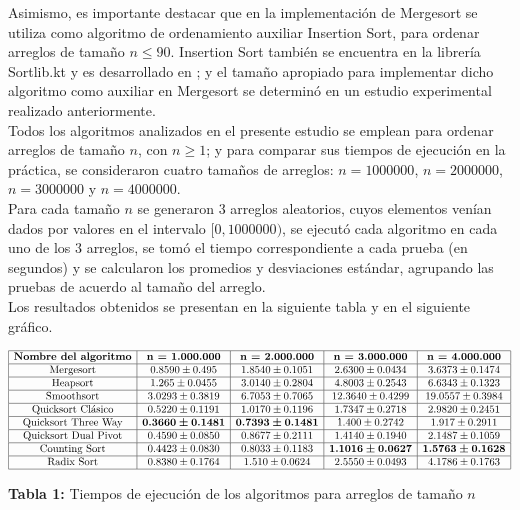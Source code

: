 \documentclass{article}
\begin{document}
	Asimismo, es importante destacar que en la implementaci\'on de Mergesort se utiliza como algoritmo de ordenamiento auxiliar Insertion Sort, para ordenar arreglos de tamaño $n \leq 90$. Insertion Sort tambi\'en se encuentra en la librer\'ia Sortlib.kt y es desarrollado en \cite{6}; y el tamaño apropiado para implementar dicho algoritmo como auxiliar en Mergesort se determin\'o en un estudio experimental realizado anteriormente.\\
	
	Todos los algoritmos analizados en el presente estudio se emplean para ordenar arreglos de tamaño $n$, con $n \geq 1$; y para comparar sus tiempos de ejecuci\'on en la pr\'actica, se consideraron cuatro tamaños de arreglos: $n = 1000000$, $n = 2000000$, $n = 3000000$ y $n = 4000000$.\\
	
	Para cada tamaño $n$ se generaron $3$ arreglos aleatorios, cuyos elementos ven\'ian dados por valores en el intervalo $[0,1000000)$, se ejecut\'o cada algoritmo en cada uno de los $3$ arreglos, se tom\'o el tiempo correspondiente a cada prueba (en segundos) y se calcularon los promedios y desviaciones est\'andar, agrupando las pruebas de acuerdo al tamaño del arreglo.\\
	
	Los resultados obtenidos se presentan en la siguiente tabla y en el siguiente gr\'afico. 

	$$\begin{array}{|c|c|c|c|c|}
		\hline
		\textbf{Nombre del algoritmo} & \textbf{n = 1.000.000} & \textbf{n = 2.000.000} & \textbf{n = 3.000.000} & \textbf{n = 4.000.000}\\
		\hline
		\text{Mergesort} & 0.8590 \pm 0.495 & 1.8540 \pm 0.1051 & 2.6300\pm 0.0434 & 3.6373 \pm 0.1474 \\
		\hline
		\text{Heapsort} & 1.265 \pm 0.0455 & 3.0140 \pm 0.2804 & 4.8003 \pm 0.2543 & 6.6343 \pm 0.1323\\
		\hline
		\text{Smoothsort} & 3.0293 \pm 0.3819 & 6.7053 \pm 0.7065 & 12.3640 \pm 0.4299 & 19.0557 \pm 0.3984\\
		\hline
		\text{Quicksort Cl\'asico} & 0.5220 \pm 0.1191 & 1.0170 \pm 0.1196 & 1.7347 \pm 0.2718 & 2.9820 \pm 0.2451\\
		\hline
		\text{Quicksort Three Way} & \boldsymbol{0.3660 \pm 0.1481} & \boldsymbol{0.7393 \pm 0.1481} & 1.400\pm 0.2742 & 1.917 \pm 0.2911\\
		\hline
		\text{Quicksort Dual Pivot} & 0.4590 \pm 0.0850 & 0.8677 \pm 0.2111 & 1.4140\pm 0.1940 & 2.1487 \pm 0.1059\\
		\hline
		\text{Counting Sort} &  0.4423 \pm 0.0830 & 0.8033 \pm 0.1183 & \boldsymbol{1.1016\pm 0.0627} & \boldsymbol{1.5763 \pm 0.1628} \\
		\hline
		\text{Radix Sort} & 0.8380 \pm 0.1764 & 1.510 \pm 0.0624 & 2.5550\pm 0.0493 & 4.1786 \pm 0.1763\\
		\hline
	\end{array}$$\:
	\begin{center}
		\textbf{Tabla 1:} Tiempos de ejecuci\'on de los algoritmos para arreglos de tamaño $n$
	\end{center}\:
\end{document}
